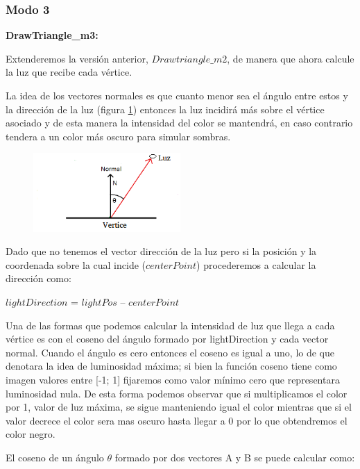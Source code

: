 \documentclass[a4paper]{article}
\newcounter{col}
\begin{document}
\pagebreak

\subsubsection{Modo 3} 


\textbf{DrawTriangle\_m3:} 

Extenderemos la versión anterior, $Drawtriangle\_m2$, de manera que ahora calcule la luz que recibe cada vértice.
\par La idea de los vectores normales es que cuanto menor sea el ángulo entre estos y la dirección de la luz (figura \ref{normal}) entonces la luz incidirá más sobre el vértice asociado y de esta manera la intensidad del color se mantendrá, en caso contrario tendera a un color más oscuro para simular sombras. 
        
        
        \begin{figure}[h]
    \centering
    \includegraphics[width=0.50\textwidth]{Imagenes/f.png}
    \caption{}
    \label{normal}
\end{figure}


Dado que no tenemos el vector dirección de la luz pero si la posición y la coordenada sobre la cual incide ($centerPoint$) procederemos a calcular la dirección como:\newline

 $lightDirection$  = $lightPos$ – $centerPoint$

\par Una de las formas que podemos calcular la intensidad de luz que llega a cada vértice es con el coseno del ángulo formado por lightDirection y cada vector normal. Cuando el ángulo es cero entonces el coseno es igual a uno, lo de que denotara la idea de luminosidad máxima; si bien la función coseno tiene como imagen valores entre [-1; 1] fijaremos como valor mínimo cero que representara luminosidad nula. De esta forma podemos observar que si multiplicamos el color por 1, valor de luz máxima, se sigue manteniendo igual el color mientras que si el valor decrece el color sera mas oscuro hasta llegar  a 0 por lo que obtendremos el color negro. 
\par El coseno de un ángulo $\theta$ formado por dos vectores A y B se puede calcular como:\newline
\end{document}
